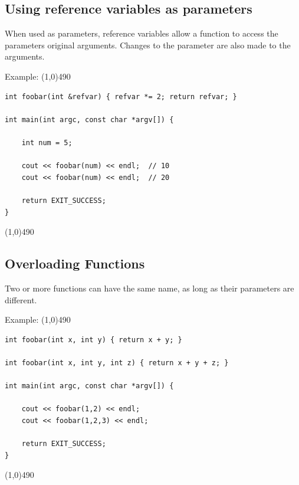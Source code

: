 \documentclass{report}
\begin{document}
    \subsection{Using reference variables as parameters}
    \bigbreak \noindent 
    \begin{concept}
 When used as parameters, reference variables allow a function to access the parameters original arguments. Changes to the parameter are also made to the arguments.
	\end{concept}
    \bigbreak \noindent 
    Example:
    \bigbreak \noindent 
    \line(1,0){490}
    \begin{verbatim}
int foobar(int &refvar) { refvar *= 2; return refvar; }

int main(int argc, const char *argv[]) {
    
    int num = 5;

    cout << foobar(num) << endl;  // 10
    cout << foobar(num) << endl;  // 20

    return EXIT_SUCCESS;
}
    \end{verbatim}
    \line(1,0){490}
    
    \bigbreak \noindent 
    \bigbreak \noindent 

    \pagebreak \bigbreak \noindent 
    \subsection{Overloading Functions}
    \bigbreak \noindent 
    \begin{concept}
 Two or more functions can have the same name, as long as their parameters are different.
	\end{concept}
    \bigbreak \noindent 
    Example:
    \bigbreak \noindent 
    \line(1,0){490}
    \begin{verbatim}
int foobar(int x, int y) { return x + y; }

int foobar(int x, int y, int z) { return x + y + z; }

int main(int argc, const char *argv[]) {

    cout << foobar(1,2) << endl;
    cout << foobar(1,2,3) << endl;

    return EXIT_SUCCESS;
}
    \end{verbatim}
    \line(1,0){490}

    \bigbreak \noindent \bigbreak \noindent 
\end{document}
